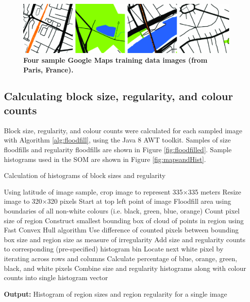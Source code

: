 \documentclass[9pt,twocolumn,twoside,lineno]{pnas-new}
\begin{document}
{\begin{figure}
\centering
\includegraphics[width=.8\linewidth]{BlockTypologies_Figures2-4.png}
\caption{\bf Four sample Google Maps training data images (from Paris, France)\cite{GoogleStatic2017}.}
 \label{fig:maps}
\end{figure} 

\subsection*{Calculating block size, regularity, and colour counts}\label{methodscalc}

Block size, regularity, and colour counts were calculated for each sampled image with Algorithm \ref{alg:floodfill}, using the Java 8 AWT toolkit\cite{Oracle2018}. Samples of size floodfills and regularity floodfills are shown in Figure \ref{fig:floodfilled}. Sample histograms used in the SOM are shown in Figure \ref{fig:mapsandHist}.

\begin{algorithm}
  \caption{Calculation of histograms of block sizes and regularity}
\begin{algorithmic}

\State Using latitude of image sample, crop image to represent 335$\times$335 meters
\State Resize image to 320$\times$320 pixels
\State Start at top left point of image
  \State Floodfill area using boundaries of all non-white colours (i.e. black, green, blue, orange)
  \State Count pixel size of region
  \State Construct smallest bounding box of cloud of points in region using Fast Convex Hull algorithm\cite{Javagl2017,GoogleArchive2011}
  \State Use difference of counted pixels between bounding box size and region size as measure of irregularity
  \State Add size and regularity counts to corresponding (pre-specified) histogram bin
  \State Locate next white pixel by iterating across rows and columns
\EndWhile
\State  Calculate percentage of blue, orange, green, black, and white pixels
\State  Combine size and regularity histograms along with colour counts into single histogram vector
\end{algorithmic}\label{alg:floodfill}
  \hspace*{\algorithmicindent} \textbf{Output:} Histogram of region sizes and region regularity for a single image
\end{algorithm}




}
\end{document}
